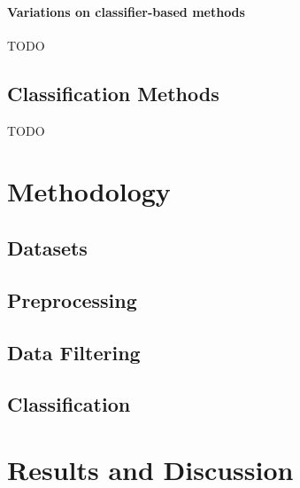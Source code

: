 \documentclass[12pt, english, openany]{book}
\begin{document}
\subsubsection{Variations on classifier-based methods}
TODO

\section{Classification Methods}
TODO

\chapter{Methodology}

\section{Datasets}

\section{Preprocessing}

\section{Data Filtering}

\section{Classification}

\chapter{Results and Discussion}





\end{document}
